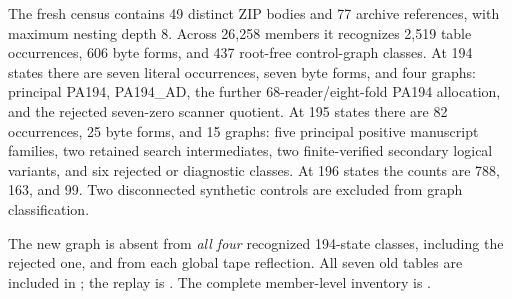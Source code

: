 The fresh census contains 49 distinct ZIP bodies and 77 archive
references, with maximum nesting depth 8. Across 26,258 members it
recognizes 2,519 table occurrences, 606 byte forms, and 437 root-free
control-graph classes. At 194 states there are seven literal occurrences,
seven byte forms, and four graphs: principal PA194, PA194\_AD, the further
68-reader/eight-fold PA194 allocation, and the rejected seven-zero scanner
quotient. At 195 states there are 82 occurrences, 25 byte forms, and 15
graphs: five principal positive manuscript families, two retained search
intermediates, two finite-verified secondary logical variants, and six
rejected or diagnostic classes. At 196 states the counts are 788, 163,
and 99. Two disconnected synthetic controls are excluded from graph
classification.

The new graph is absent from \emph{all four} recognized 194-state
classes, including the rejected one, and from each global tape
reflection. All seven old tables are included in
; the replay is
. The complete member-level
inventory is .
